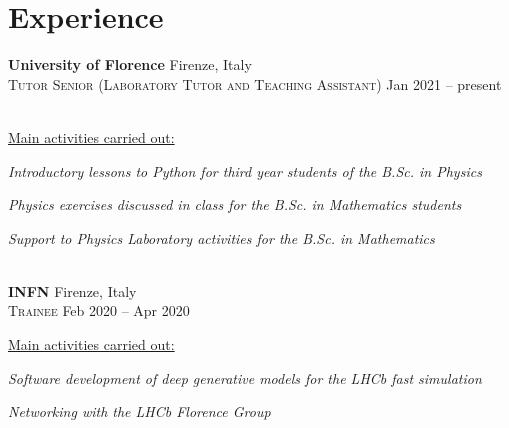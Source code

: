 \newcommand{\institution}[2]
  {\large \textbf{\color{hlcolor-0} #1} \hfill {\color{hlcolor-2} #2}}

\newcommand{\role}[2]
  {\small \color{hlcolor-1} 
  {\color{iconcolor} \faBriefcase}
  \textsc{#1} \hfill {#2}}


\section*{Experience}
\begin{cvcontent}
  \institution{University of Florence}{Firenze, Italy}\\ [0.5mm]
  \role{Tutor Senior (Laboratory Tutor and Teaching Assistant)}{Jan 2021 -- present}\\ [1.5mm]
  \\ [1.5mm]
  {\normalsize \color{maincolor} \ul{Main activities carried out:}\\ [1.5mm]
  \begin{itemize*}[label=\textcolor{iconcolor}{\textbullet}]
    \item \emph{Introductory lessons to Python for third year 
      students of the B.Sc. in Physics}\\ [0.5mm]
    \item \emph{Physics exercises discussed in class for the 
      B.Sc. in Mathematics students}\\ [0.5mm]
    \item \emph{Support to Physics Laboratory activities for 
      the B.Sc. in Mathematics}
  \end{itemize*}}
  \\ [5mm]
  \institution{INFN}{Firenze, Italy}\\ [0.5mm]
  \role{Trainee}{Feb 2020 -- Apr 2020}\\ [1.5mm]
  {\normalsize \color{maincolor} \ul{Main activities carried out:}\\ [1.5mm]
  \begin{itemize*}[label=\textcolor{iconcolor}{\textbullet}]
    \item \emph{Software development of deep generative models 
      for the LHCb fast simulation}\\ [0.5mm]
    \item \emph{Networking with the LHCb Florence Group}
  \end{itemize*}}

\end{cvcontent}
